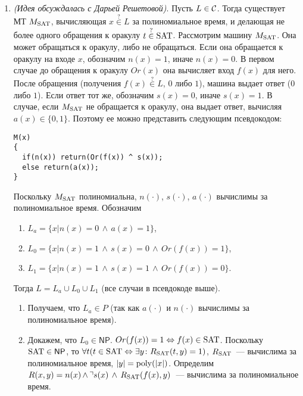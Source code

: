 \documentclass[a4paper]{article}
\def\C{{\cal C}}
\def\NP{{\mathsf{NP}}}
\def\SAT{{\rm{SAT}}}
\def\poly{{\rm{poly}}}
\begin{document}
\begin{enumerate}
\begin{enumerate}
\end{enumerate}
\item {\em (Идея обсуждалась с Дарьей Решетовой)}. Пусть $L\in \C$. Тогда существует МТ $M_\SAT$, вычисляющая $x\overset{?}{\in}L$ за полиномиальное время, и делающая не более одного обращения к оракулу $t\overset{?}{\in}\SAT$. Рассмотрим машину $M_\SAT$. Она может обращаться к оракулу, либо не обращаться. Если она обращается к оракулу на входе $x$, обозначим $n(x)=1$, иначе $n(x)=0$. В первом случае до обращения к оракулу $Or(x)$ она вычисляет вход $f(x)$ для него. После обращения (получения $f(x)\overset{?}{\in}L$, $0$ либо $1$), машина выдает ответ ($0$ либо $1$). Если ответ тот же, обозначим $s(x)=0$, иначе $s(x)=1$. В случае, если $M_\SAT$ не обращается к оракулу, она выдает ответ, вычисляя $a(x)\in\{0, 1\}$. Поэтому ее можно представить следующим псевдокодом:
\begin{lstlisting}
M(x)
{
  if(n(x)) return(Or(f(x)) ^ s(x));
  else return(a(x));
}
\end{lstlisting}
Поскольку $M_\SAT$ полиномиальна, $n(\cdot)$, $s(\cdot)$, $a(\cdot)$ вычислимы за полиномиальное время.\newline
Обозначим \begin{enumerate}
\item  $L_a=\{x\big| n(x)=0\,\wedge\, a(x)=1\}$,
\item $L_0=\{x\big| n(x)=1\,\wedge\, s(x)=0\,\wedge\, Or(f(x))=1\}$,
\item $L_1=\{x\big| n(x)=1\,\wedge\, s(x)=1\,\wedge\, Or(f(x))=0\}$.
\end{enumerate}
Тогда $L=L_a\cup L_0\cup L_1$ (все случаи в псевдокоде выше).\begin{enumerate}
\item Получаем, что $L_a\in P$ (так как $a(\cdot)$ и $n(\cdot)$ вычислимы за полиномиальное время).
\item Докажем, что $L_0\in \NP$. $Or(f(x))=1\Leftrightarrow f(x)\in \SAT$. Поскольку $\SAT\in\NP$, то $\forall t(t\in\SAT\Leftrightarrow\exists y\colon R_\SAT(t,y)=1)$, $R_\SAT$~--- вычислима за полиномиальное время, $|y|=\poly(|x|)$. Определим $R(x,y)=n(x)\,\wedge\,\urcorner s(x)\,\wedge\, R_\SAT(f(x),y)$~--- вычислима за полиномиальное время.\begin{enumerate}

\end{enumerate}
\end{enumerate}
\end{enumerate}
\end{document}
